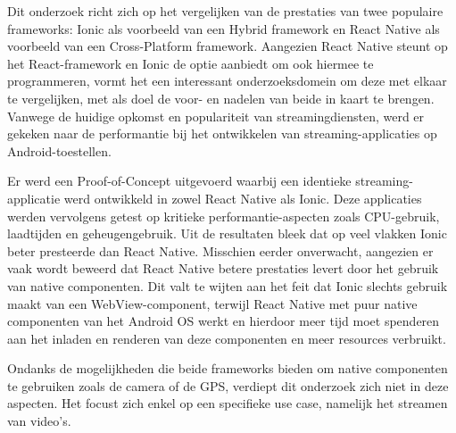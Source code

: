 Dit onderzoek richt zich op het vergelijken van de prestaties van twee populaire frameworks: Ionic als voorbeeld van een Hybrid framework en React Native als voorbeeld van een Cross-Platform framework. Aangezien React Native steunt op het React-framework en Ionic de optie aanbiedt om ook hiermee te programmeren, vormt het een interessant onderzoeksdomein om deze met elkaar te vergelijken, met als doel de voor- en nadelen van beide in kaart te brengen. Vanwege de huidige opkomst en populariteit van streamingdiensten, werd er gekeken naar de performantie bij het ontwikkelen van streaming-applicaties op Android-toestellen. 

Er werd een Proof-of-Concept uitgevoerd waarbij een identieke streaming-applicatie werd ontwikkeld in zowel React Native als Ionic. Deze applicaties werden vervolgens getest op kritieke performantie-aspecten zoals CPU-gebruik, laadtijden en geheugengebruik. Uit de resultaten bleek dat op veel vlakken Ionic beter presteerde dan React Native. Misschien eerder onverwacht, aangezien er vaak wordt beweerd dat React Native betere prestaties levert door het gebruik van native componenten. Dit valt te wijten aan het feit dat Ionic slechts gebruik maakt van een WebView-component, terwijl React Native met puur native componenten van het Android OS werkt en hierdoor meer tijd moet spenderen aan het inladen en renderen van deze componenten en meer resources verbruikt.

Ondanks de mogelijkheden die beide frameworks bieden om native componenten te gebruiken zoals de camera of de GPS, verdiept dit onderzoek zich niet in deze aspecten. Het focust zich enkel op een specifieke use case, namelijk het streamen van video's.









